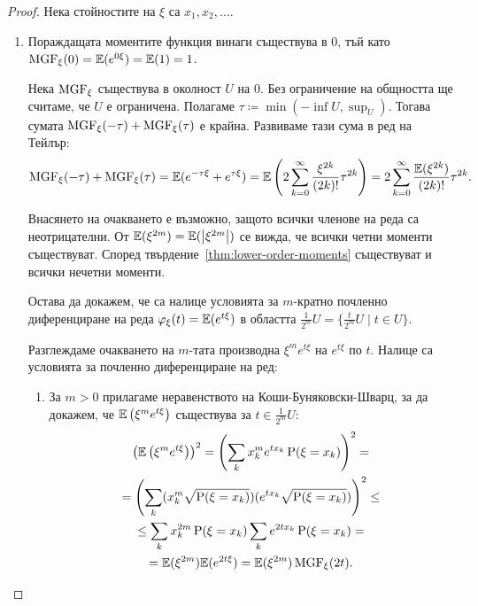 \documentclass[numbers=endperiod, DIV=15, bibliography=totocnumbered]{scrartcl}
\begin{document}
\begin{proof}
  Нека стойностите на $\xi$ са $x_1, x_2, \ldots$.

  \mbox{}
  \begin{enumerate}
    \item Пораждащата моментите функция винаги съществува в $0$, тъй като $\operatorname{MGF}_\xi(0) = \mathbb{E}(e^{0\xi}) = \mathbb{E}(1) = 1$.

    Нека $\operatorname{MGF}_\xi$ съществува в околност $U$ на $0$. Без ограничение на общността ще считаме, че $U$ е ограничена. Полагаме $\tau \coloneqq \min(-\inf U, \sup_U)$. Тогава сумата $\operatorname{MGF}_\xi(-\tau) + \operatorname{MGF}_\xi(\tau)$ е крайна. Развиваме тази сума в ред на Тейлър:
    \begin{displaymath}
      \operatorname{MGF}_\xi(-\tau) + \operatorname{MGF}_\xi(\tau)
      =
      \mathbb{E}(e^{-\tau\xi} + e^{\tau\xi})
      =
      \mathbb{E}\left( 2 \sum_{k=0}^\infty \frac {\xi^{2k}} {(2k)!} \tau^{2k} \right)
      =
      2 \sum_{k=0}^\infty \frac {\mathbb{E}(\xi^{2k})} {(2k)!} \tau^{2k}.
    \end{displaymath}

    Внасянето на очакването е възможно, защото всички членове на реда са неотрицателни. От $\mathbb{E}(\xi^{2m}) = \mathbb{E}(\left\vert \xi^{2m} \right\vert)$ се вижда, че всички четни моменти съществуват. Според твърдение~\ref{thm:lower-order-moments} съществуват и всички нечетни моменти.

    Остава да докажем, че са налице условията за $m$-кратно почленно диференциране на реда $\varphi_\xi(t) = \mathbb{E} (e^{t\xi})$ в областта $\frac 1 {2^m} U = \{ \frac t {2^m} U \mid t \in U \}$.

    Разглеждаме очакването на $m$-тата производна $\xi^m e^{t \xi}$ на $e^{t \xi}$ по $t$. Налице са условията за почленно диференциране на ред:
    \begin{enumerate}
      \item За $m > 0$ прилагаме неравенството на Коши-Буняковски-Шварц, за да докажем, че $\mathbb{E} \left( \xi^m e^{t \xi} \right)$ съществува за $t \in \frac 1 {2^m} U$:
      \begin{multline*}
        {\left(\mathbb{E}\left( \xi^m e^{t \xi} \right) \right)}^2
        =
        {\left(\sum_k x_k^m e^{t x_k} \operatorname{P}(\xi = x_k) \right)}^2
        = \\ =
        {\left(\sum_k (x_k^m \sqrt{\operatorname{P}(\xi = x_k)}) (e^{t x_k} \sqrt{\operatorname{P}(\xi = x_k)}) \right)}^2
        \leq \\ \leq
        \sum_k x_k^{2m} \operatorname{P}(\xi = x_k)
        \sum_k e^{2t x_k} \operatorname{P}(\xi = x_k)
        = \\ =
        \mathbb{E}(\xi^{2m})
        \mathbb{E}(e^{2t \xi})
        =
        \mathbb{E}(\xi^{2m})
        \operatorname{MGF}_\xi(2t).
      \end{multline*}


\end{enumerate}
\end{enumerate}
\end{proof}
\end{document}
